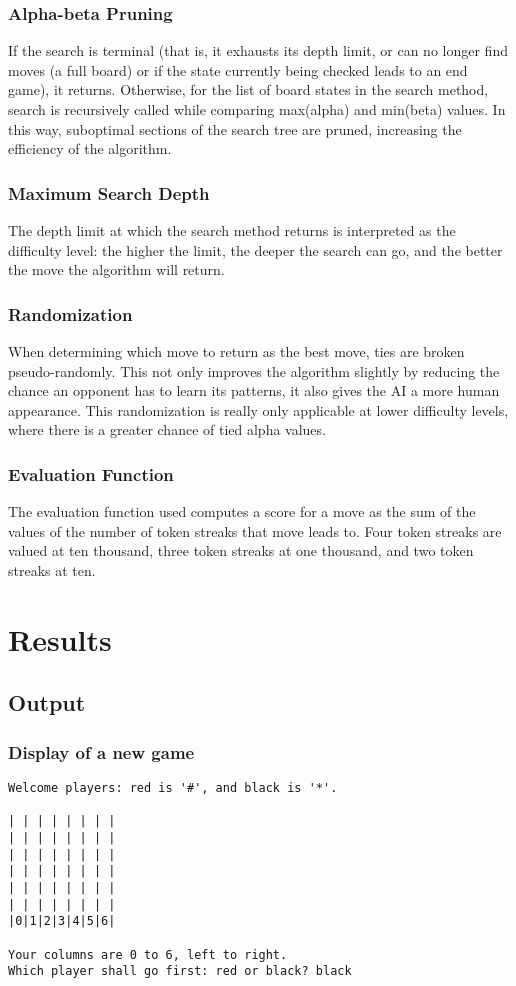 \documentclass[12pt, article]{scrartcl}
\begin{document}
\subsubsection{Alpha-beta Pruning}
If the search is terminal (that is, it exhausts its depth limit, or can no longer find moves (a full board) or if the state currently being checked leads to an end game), it returns. Otherwise, for the list of board states in the search method, search is recursively called while comparing max(alpha) and min(beta) values. In this way, suboptimal sections of the search tree are pruned, increasing the efficiency of the algorithm.

\subsubsection{Maximum Search Depth}
The depth limit at which the search method returns is interpreted as the difficulty level: the higher the limit, the deeper the search can go, and the better the move the algorithm will return.

\subsubsection{Randomization}
When determining which move to return as the best move, ties are broken pseudo-randomly. This not only improves the algorithm slightly by reducing the chance an opponent has to learn its patterns, it also gives the AI a more human appearance. This randomization is really only applicable at lower difficulty levels, where there is a greater chance of tied alpha values.

\subsubsection{Evaluation Function}
The evaluation function used computes a score for a move as the sum of the values of the number of token streaks that move leads to. Four token streaks are valued at ten thousand, three token streaks at one thousand, and two token streaks at ten.

\section{Results}
\subsection{Output}
\subsubsection{Display of a new game}
\begin{verbatim}
Welcome players: red is '#', and black is '*'.

| | | | | | | |
| | | | | | | |
| | | | | | | |
| | | | | | | |
| | | | | | | |
| | | | | | | |
|0|1|2|3|4|5|6|

Your columns are 0 to 6, left to right.
Which player shall go first: red or black? black
\end{verbatim}
\end{document}
